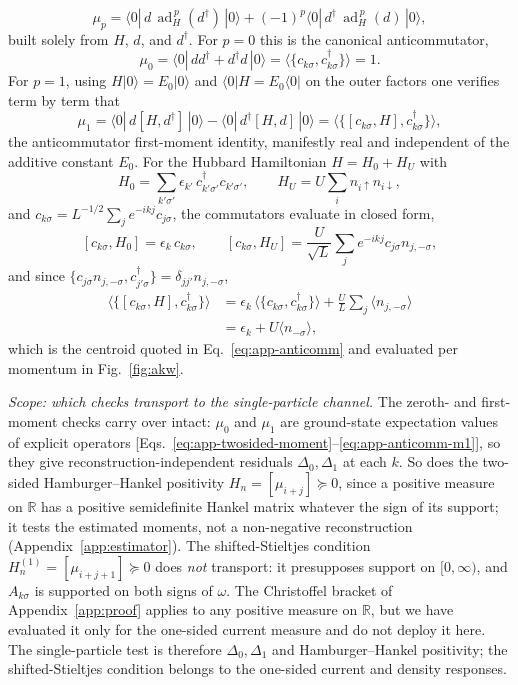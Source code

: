 \documentclass[submission, PhysCore]{SciPost}
\begin{document}
\begin{appendix}
\begin{equation}
\mu_p=\langle 0|\,d\,\operatorname{ad}_H^{\,p}(d^\dagger)\,|0\rangle+(-1)^p\langle 0|\,d^\dagger\,\operatorname{ad}_H^{\,p}(d)\,|0\rangle,
\label{eq:app-twosided-moment}
\end{equation}
built solely from $H$, $d$, and $d^\dagger$. For $p=0$ this is the canonical anticommutator,
\[
\mu_0=\langle 0|\,dd^\dagger+d^\dagger d\,|0\rangle=\langle\{c_{k\sigma},c_{k\sigma}^\dagger\}\rangle=1 .
\]
For $p=1$, using $H|0\rangle=E_0|0\rangle$ and $\langle 0|H=E_0\langle 0|$ on the outer factors one verifies term by term that
\begin{equation}
\mu_1=\langle 0|\,d[H,d^\dagger]\,|0\rangle-\langle 0|\,d^\dagger[H,d]\,|0\rangle=\big\langle\{[c_{k\sigma},H],c_{k\sigma}^\dagger\}\big\rangle,
\label{eq:app-anticomm-m1}
\end{equation}
the anticommutator first-moment identity, manifestly real and independent of the additive constant $E_0$. For the Hubbard Hamiltonian $H=H_0+H_U$ with
\[
H_0=\sum_{k'\sigma'}\epsilon_{k'}\,c^\dagger_{k'\sigma'}c_{k'\sigma'},\qquad H_U=U\sum_i n_{i\uparrow}n_{i\downarrow},
\]
and $c_{k\sigma}=L^{-1/2}\sum_j e^{-ikj}c_{j\sigma}$, the commutators evaluate in closed form,
\[
[c_{k\sigma},H_0]=\epsilon_k\,c_{k\sigma},\qquad [c_{k\sigma},H_U]=\frac{U}{\sqrt L}\sum_j e^{-ikj}c_{j\sigma}n_{j,-\sigma},
\]
and since $\{c_{j\sigma}n_{j,-\sigma},c_{j'\sigma}^\dagger\}=\delta_{jj'}n_{j,-\sigma}$,
\begin{equation}
\begin{split}
\big\langle\{[c_{k\sigma},H],c_{k\sigma}^\dagger\}\big\rangle&=\epsilon_k\,\langle\{c_{k\sigma},c_{k\sigma}^\dagger\}\rangle+\frac{U}{L}\sum_j\langle n_{j,-\sigma}\rangle\\
&=\epsilon_k+U\langle n_{-\sigma}\rangle,
\end{split}
\end{equation}
which is the centroid quoted in Eq.~\eqref{eq:app-anticomm} and evaluated per momentum in Fig.~\ref{fig:akw}.

\emph{Scope: which checks transport to the single-particle channel.} The zeroth- and first-moment checks carry over intact: $\mu_0$ and $\mu_1$ are ground-state expectation values of explicit operators [Eqs.~\eqref{eq:app-twosided-moment}--\eqref{eq:app-anticomm-m1}], so they give reconstruction-independent residuals $\Delta_0,\Delta_1$ at each $k$. So does the two-sided Hamburger--Hankel positivity $H_n=[\mu_{i+j}]\succeq 0$, since a positive measure on $\mathbb{R}$ has a positive semidefinite Hankel matrix whatever the sign of its support; it tests the estimated moments, not a non-negative reconstruction (Appendix~\ref{app:estimator}). The shifted-Stieltjes condition $H_n^{(1)}=[\mu_{i+j+1}]\succeq 0$ does \emph{not} transport: it presupposes support on $[0,\infty)$, and $A_{k\sigma}$ is supported on both signs of $\omega$. The Christoffel bracket of Appendix~\ref{app:proof} applies to any positive measure on $\mathbb{R}$, but we have evaluated it only for the one-sided current measure and do not deploy it here. The single-particle test is therefore $\Delta_0,\Delta_1$ and Hamburger--Hankel positivity; the shifted-Stieltjes condition belongs to the one-sided current and density responses.

\end{appendix}
\end{document}
